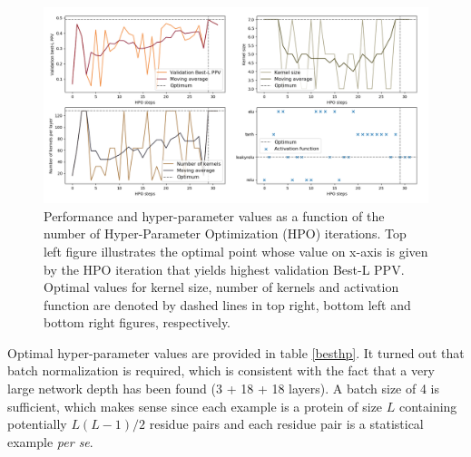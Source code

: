     \begin{figure}[H]
        \begin{center}
            \includegraphics[width=\textwidth, keepaspectratio]{imgs/hpo2.png}
            \caption{Performance and hyper-parameter values as a function of the number
            of Hyper-Parameter Optimization (HPO) iterations.
            Top left figure illustrates the optimal point whose value on x-axis
            is given by the HPO iteration that yields highest validation Best-L PPV.
            Optimal values for kernel size, number of kernels and activation function are denoted
            by dashed lines in top right, bottom left and bottom right figures, respectively.}
            \label{hpoparams2}
        \end{center}
    \end{figure}

    Optimal hyper-parameter values are provided in table \ref{besthp}.
    It turned out that batch normalization is required, which is consistent
    with the fact that a very large network depth has been found
    (3 + 18 + 18 layers). A batch size of 4 is sufficient, which makes sense
    since each example is a protein of size $L$ containing potentially
    $L (L - 1) / 2$ residue pairs and each residue pair is a statistical
    example \textit{per se}.

